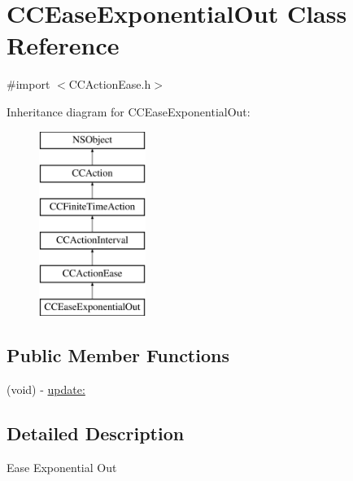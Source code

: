 \hypertarget{interface_c_c_ease_exponential_out}{\section{C\-C\-Ease\-Exponential\-Out Class Reference}
\label{interface_c_c_ease_exponential_out}
}


{\ttfamily \#import $<$C\-C\-Action\-Ease.\-h$>$}

Inheritance diagram for C\-C\-Ease\-Exponential\-Out\-:\begin{figure}[H]
\begin{center}
\leavevmode
\includegraphics[height=6.000000cm]{interface_c_c_ease_exponential_out}
\end{center}
\end{figure}
\subsection*{Public Member Functions}
\begin{DoxyCompactItemize}
\item 
(void) -\/ \hyperlink{interface_c_c_ease_exponential_out_a47842dd3cbfdb4360b8597517f1131b8}{update\-:}
\end{DoxyCompactItemize}


\subsection{Detailed Description}
Ease Exponential Out 

